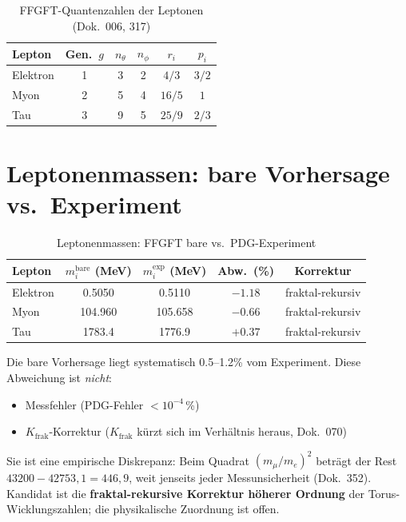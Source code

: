 \begin{table}[H]
\centering
\caption{FFGFT-Quantenzahlen der Leptonen (Dok.~006, 317)}
\begin{tabular}{lccccc}
\toprule
Lepton & Gen.\ $g$ & $n_\theta$ & $n_\phi$ & $r_i$ & $p_i$ \\
\midrule
Elektron & 1 & 3 & 2 & $4/3$  & $3/2$ \\
Myon     & 2 & 5 & 4 & $16/5$ & $1$   \\
Tau      & 3 & 9 & 5 & $25/9$ & $2/3$ \\
\bottomrule
\end{tabular}
\end{table}

\section{Leptonenmassen: bare Vorhersage vs.\ Experiment}

\begin{table}[H]
\centering
\caption{Leptonenmassen: FFGFT bare vs.\ PDG-Experiment}
\begin{tabular}{lcccc}
\toprule
Lepton & $m_i^{\text{bare}}$ (MeV) & $m_i^{\text{exp}}$ (MeV) & Abw.\ (\%) & Korrektur \\
\midrule
Elektron & 0.5050 & 0.5110 & $-1.18$ & fraktal-rekursiv \\
Myon     & 104.960 & 105.658 & $-0.66$ & fraktal-rekursiv \\
Tau      & 1783.4  & 1776.9  & $+0.37$ & fraktal-rekursiv \\
\bottomrule
\end{tabular}
\end{table}

Die bare Vorhersage liegt systematisch 0.5--1.2\% vom Experiment.
Diese Abweichung ist \emph{nicht}:
\begin{itemize}
  \item Messfehler (PDG-Fehler $< 10^{-4}$\,\%)
  \item $K_\text{frak}$-Korrektur ($K_\text{frak}$ kürzt sich im Verhältnis heraus, Dok.~070)
\end{itemize}
Sie ist eine empirische Diskrepanz: Beim Quadrat $(m_\mu/m_e)^2$ beträgt
der Rest $43200 - 42753{,}1 = 446{,}9$, weit jenseits jeder Messunsicherheit
(Dok.~352). Kandidat ist die \textbf{fraktal-rekursive Korrektur höherer
Ordnung} der Torus-Wicklungszahlen; die physikalische Zuordnung ist offen.


